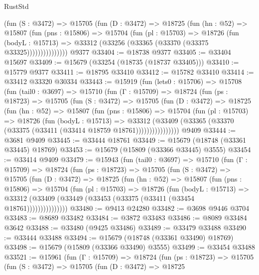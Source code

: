 \begin{lexlean}{RustStd}
\begin{coremodule}
              (fun (S : @3472) =>
              @15705
                (fun (D : @3472) =>
                @18725
                  (fun (hn : @52) =>
                  @15807
                    (fun (pns : @15806) =>
                    @15704
                      (fun (pl : @15703) =>
                      @18726
                        (fun (bodyL : @15713) =>
                        @33312 (@33256 (@33365 (@33370 (@33375 @33325)))))))))))))))
    @9377
@33404 := @18738 @9377
@33405 := @33404 @15697
@33409 := @15679 (@33254 (@18735 (@18737 @33405)))
@33410 := @15779 @9377
@33411 := @18795 @33410
@33412 := @15782 @33410
@33414 := @33412 @33320 @30334
@33443 := @15919
    (fun (lets0 : @15706) =>
    @15708
      (fun (tail0 : @3697) =>
      @15710
        (fun (Γ : @15709) =>
        @18724
          (fun (ps : @18723) =>
          @15705
            (fun (S : @3472) =>
            @15705
              (fun (D : @3472) =>
              @18725
                (fun (hn : @52) =>
                @15807
                  (fun (pns : @15806) =>
                  @15704
                    (fun (pl : @15703) =>
                    @18726
                      (fun (bodyL : @15713) =>
                      @33312
                        (@33409
                          (@33365 (@33370 (@33375 (@33411 (@33414 @18759 @18761))))))))))))))))
    @9409
@33444 := @3681 @9409
@33445 := @33444 @18761
@33449 := @15679 (@18748 (@33361 @33445) @18769)
@33453 := @15679 (@15809 (@33366 @33445) @3555)
@33454 := @33414 @9409
@33479 := @15943
    (fun (tail0 : @3697) =>
    @15710
      (fun (Γ : @15709) =>
      @18724
        (fun (ps : @18723) =>
        @15705
          (fun (S : @3472) =>
          @15705
            (fun (D : @3472) =>
            @18725
              (fun (hn : @52) =>
              @15807
                (fun (pns : @15806) =>
                @15704
                  (fun (pl : @15703) =>
                  @18726
                    (fun (bodyL : @15713) =>
                    @33312 (@33409 (@33449 (@33453 (@33375 (@33411 (@33454 @18761)))))))))))))))
@33480 := @9413 @24280
@33482 := @3698 @9446 @3704
@33483 := @8689 @33482
@33484 := @3872 @33483
@33486 := @8089 @33484 @3642
@33488 := @33480 (@9425 @33486)
@33489 := @33479 @33488
@33490 := @33444 @33488
@33494 := @15679 (@18748 (@33361 @33490) @18769)
@33498 := @15679 (@15809 (@33366 @33490) @3555)
@33499 := @33454 @33488
@33521 := @15961
    (fun (Γ : @15709) =>
    @18724
      (fun (ps : @18723) =>
      @15705
        (fun (S : @3472) =>
        @15705
          (fun (D : @3472) =>
          @18725

\end{coremodule}
\end{lexlean}
